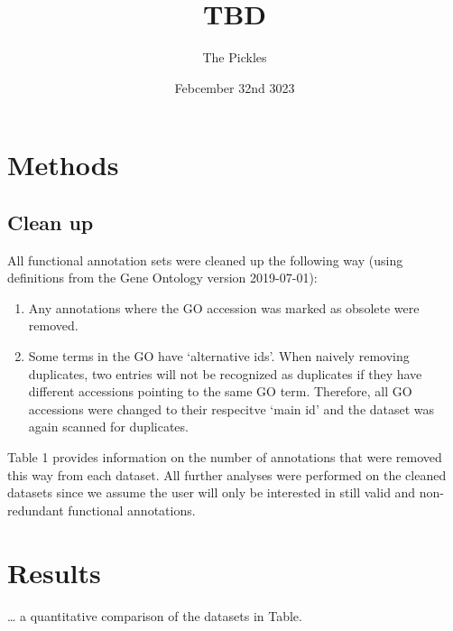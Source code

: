 \documentclass[]{article}
\title{TBD}
\author{The Pickles}
\date{Febcember 32nd 3023}
\providecommand{\tightlist}{%
  \setlength{\itemsep}{0pt}\setlength{\parskip}{0pt}}
\begin{document}
\maketitle

\hypertarget{methods}{%
\section{Methods}\label{methods}}

\hypertarget{clean-up}{%
\subsection{Clean up}\label{clean-up}}

All functional annotation sets were cleaned up the following way (using
definitions from the Gene Ontology version 2019-07-01):

\begin{enumerate}
\def\labelenumi{\arabic{enumi}.}
\tightlist
\item
  Any annotations where the GO accession was marked as obsolete were
  removed.
\item
  Some terms in the GO have `alternative ids'. When naively removing
  duplicates, two entries will not be recognized as duplicates if they
  have different accessions pointing to the same GO term. Therefore, all
  GO accessions were changed to their respecitve `main id' and the
  dataset was again scanned for duplicates.
\end{enumerate}

Table 1 provides information on the number of annotations that were
removed this way from each dataset. All further analyses were performed
on the cleaned datasets since we assume the user will only be interested
in still valid and non-redundant functional annotations.

\hypertarget{results}{%
\section{Results}\label{results}}

\ldots{} a quantitative comparison of the datasets in Table.
\end{document}
